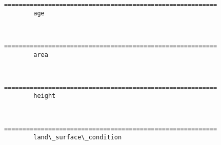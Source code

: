 \documentclass[11pt]{article}
\begin{document}
    \begin{Verbatim}[commandchars=\\\{\}]
==========================================================
	 	age

    \end{Verbatim}

    \begin{center}
    \end{center}
    { \hspace*{\fill} \\}
    
    \begin{Verbatim}[commandchars=\\\{\}]
==========================================================
	 	area

    \end{Verbatim}

    \begin{center}
    \end{center}
    { \hspace*{\fill} \\}
    
    \begin{Verbatim}[commandchars=\\\{\}]
==========================================================
	 	height

    \end{Verbatim}

    \begin{center}
    \end{center}
    { \hspace*{\fill} \\}
    
    \begin{Verbatim}[commandchars=\\\{\}]
==========================================================
	 	land\_surface\_condition

    \end{Verbatim}

    \begin{center}
    \end{center}
    { \hspace*{\fill} \\}
    
\end{document}
